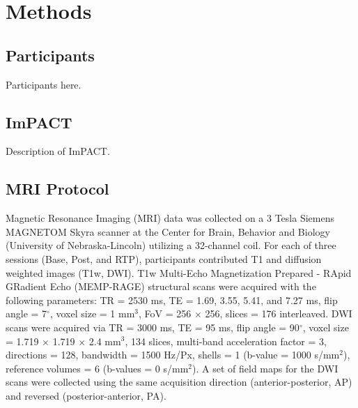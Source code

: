 \documentclass[12pt]{article}
\begin{document}


\section{Methods}
\label{sec:meth}

\subsection{Participants}
\label{ssec:meth-part}
Participants here.


\subsection{ImPACT}
\label{ssec:meth-imp}
Description of ImPACT.



\subsection{MRI Protocol}
\label{ssec:meth-mri}

Magnetic Resonance Imaging (MRI) data was collected on a 3 Tesla Siemens MAGNETOM Skyra scanner at the Center for Brain, Behavior and Biology (University of Nebraska-Lincoln) utilizing a 32-channel coil. For each of three sessions (Base, Post, and RTP), participants contributed T1 and diffusion weighted images (T1w, DWI). T1w Multi-Echo Magnetization Prepared - RApid GRadient Echo (MEMP-RAGE) structural scans were acquired with the following parameters: TR = 2530 ms, TE = 1.69, 3.55, 5.41, and 7.27 ms, flip angle = 7$^{\circ}$, voxel size = 1 mm$^3$, FoV = 256 $\times$ 256, slices = 176 interleaved. DWI scans were acquired via TR = 3000 ms, TE = 95 ms, flip angle = 90$^{\circ}$, voxel size = 1.719 $\times$ 1.719 $\times$ 2.4 mm$^3$, 134 slices, multi-band acceleration factor = 3, directions = 128, bandwidth = 1500 Hz/Px, shells = 1 (b-value = 1000 s/mm$^2$), reference volumes = 6 (b-values = 0 s/mm$^2$). A set of field maps for the DWI scans were collected using the same acquisition direction (anterior-posterior, AP) and reversed (posterior-anterior, PA).
\end{document}
